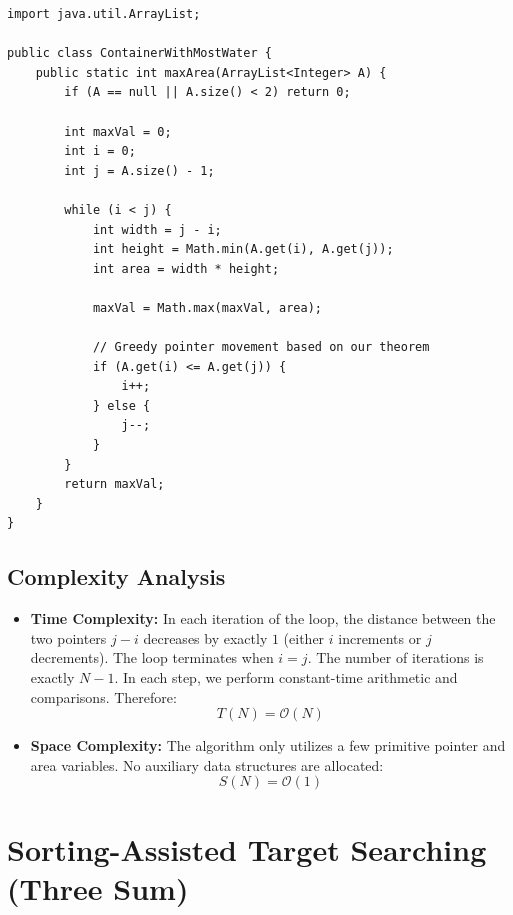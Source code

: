 \documentclass[10pt,journal,compsoc,onecolumn]{IEEEtran}
\begin{document}
\begin{verbatim}
import java.util.ArrayList;

public class ContainerWithMostWater {
    public static int maxArea(ArrayList<Integer> A) {
        if (A == null || A.size() < 2) return 0;
        
        int maxVal = 0;
        int i = 0;
        int j = A.size() - 1;
        
        while (i < j) {
            int width = j - i;
            int height = Math.min(A.get(i), A.get(j));
            int area = width * height;
            
            maxVal = Math.max(maxVal, area);
            
            // Greedy pointer movement based on our theorem
            if (A.get(i) <= A.get(j)) {
                i++;
            } else {
                j--;
            }
        }
        return maxVal;
    }
}
\end{verbatim}

\subsection{Complexity Analysis}

\begin{itemize}
    \item \textbf{Time Complexity:} In each iteration of the loop, the distance between the two pointers $j - i$ decreases by exactly $1$ (either $i$ increments or $j$ decrements). The loop terminates when $i = j$. The number of iterations is exactly $N - 1$. In each step, we perform constant-time arithmetic and comparisons. Therefore:
    \begin{equation}
    T(N) = \mathcal{O}(N)
    \end{equation}
    \item \textbf{Space Complexity:} The algorithm only utilizes a few primitive pointer and area variables. No auxiliary data structures are allocated:
    \begin{equation}
    S(N) = \mathcal{O}(1)
    \end{equation}
\end{itemize}

\section{Sorting-Assisted Target Searching (Three Sum)}
\label{sec:threesum}
\end{document}
